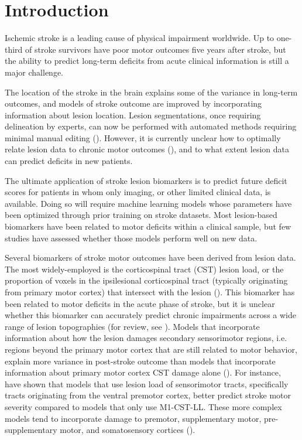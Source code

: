 \documentclass[10pt]{article}
\begin{document}
\section{Introduction}
Ischemic stroke is a leading cause of physical impairment worldwide. Up to one-third of stroke survivors have poor motor outcomes five years after stroke, but the ability to predict long-term deficits from acute clinical information is still a major challenge.

The location of the stroke in the brain explains some of the variance in long-term outcomes, and models of stroke outcome are improved by incorporating information about lesion location. Lesion segmentations, once requiring  delineation by experts, can now be performed with automated methods requiring minimal manual editing (\cite{Pustina2016-qu}). However, it is currently unclear how to optimally relate lesion data to chronic motor outcomes (\cite{Sperber2020-kp, Kasties2021-rm}), and to what extent lesion data can predict deficits in new patients.

The ultimate application of stroke lesion biomarkers is to predict future deficit scores for patients in whom only imaging, or other limited clinical data, is available. Doing so will require machine learning models whose parameters have been optimized through prior training on stroke datasets. Most lesion-based biomarkers have been related to motor deficits within a clinical sample, but few studies have assessed whether those models perform well on new data.

Several biomarkers of stroke motor outcomes have been derived from lesion data. The most widely-employed is the corticospinal tract (CST) lesion load, or the proportion of voxels in the ipsilesional corticospinal tract (typically originating from primary motor cortex) that intersect with the lesion (\cite{Zhu2010-qh, Feng2015-du}). This biomarker has been related to motor deficits in the acute phase of stroke, but it is unclear whether this biomarker can accurately predict chronic impairments across a wide range of lesion topographies (for review, see \cite{Kim2017-xe}). Models that incorporate information about how the lesion damages secondary sensorimotor regions, i.e. regions beyond the primary motor cortex that are still related to motor behavior, explain more variance in post-stroke outcome than models that incorporate information about primary motor cortex CST damage alone (\cite{Ito2022-em, Sperber2021-lw, Rondina2016-ds, Rondina2017-ij, Schulz2012-yy}). For instance, \cite{Ito2022-em} have shown that models that use lesion load of sensorimotor tracts, specifically tracts originating from the ventral premotor cortex, better predict stroke motor severity compared to models that only use M1-CST-LL. These more complex models tend to incorporate damage to premotor, supplementary motor, pre-supplementary motor, and somatosensory cortices (\cite{Ito2022-em,Schulz2012-yy, Sperber2021-lw, Rondina2016-ds, Rondina2017-ij}).
\end{document}
